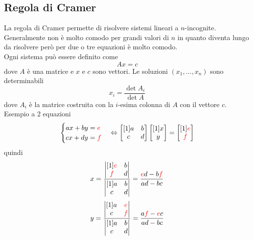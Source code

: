 \subsection{Regola di Cramer}
La regola di Cramer permette di risolvere sistemi lineari a $n$-incognite. Generalmente non è molto
comodo per grandi valori di $n$ in quanto diventa lungo da risolvere però per due o tre equazioni è
molto comodo.\\ [\baselineskip]
Ogni sistema può essere definito come
\begin{equation*}
Ax = c
\end{equation*}
dove $A$ è una matrice e $x$ e $c$ sono vettori. Le soluzioni $(x_1,\ldots,x_n)$ sono determinabili
\begin{equation*}
x_i = \frac{\det A_i}{\det A}
\end{equation*}
dove $A_i$ è la matrice costruita con la $i$-esima colonna di $A$ con il vettore $c$.\\
Esempio a 2 equazioni
\begin{equation*}
\begin{cases}
ax+by=\mathcolor{red}{e}\\cx+dy=\mathcolor{red}{f}
\end{cases} \Leftrightarrow
\begin{bmatrix}[1]
a&b\\c&d
\end{bmatrix}
\begin{bmatrix}[1]
x\\y
\end{bmatrix}=
\begin{bmatrix}[1]
\mathcolor{red}{e}\\\mathcolor{red}{f}
\end{bmatrix}
\end{equation*}
quindi
\begin{align*}
x = \frac{\begin{vmatrix}[1]
	\mathcolor{red}{e}&b\\\mathcolor{red}{f}&d
	\end{vmatrix}}{\begin{vmatrix}[1]
	a&b\\c&d
	\end{vmatrix}}= \frac{\mathcolor{red}{e}d-b\mathcolor{red}{f}}{ad-bc}
\end{align*}
\begin{align*}
y = \frac{\begin{vmatrix}[1]
	a&\mathcolor{red}{e}\\c&\mathcolor{red}{f}
	\end{vmatrix}}{\begin{vmatrix}[1]
	a&b\\c&d
	\end{vmatrix}}= \frac{a\mathcolor{red}{f}-\mathcolor{red}{e}c}{ad-bc}
\end{align*}

